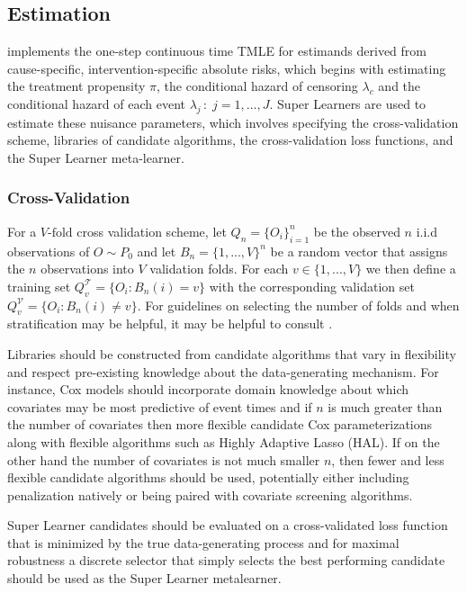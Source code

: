 \documentclass{report}
\newcommand{\1}{\ensuremath{\mathbf{1}}}
\newcommand{\g}{\ensuremath{\pi}}
\begin{document}
\subsection{Estimation}
\label{estimation}
 implements the one-step continuous time TMLE for estimands derived from cause-specific, intervention-specific absolute risks, which begins with estimating the treatment propensity \(\g\), the conditional hazard of censoring \(\lambda_c\) and the conditional hazard of each event \(\lambda_j \,:\; j = 1, \dots, J\). Super Learners are used to estimate these nuisance parameters, which involves specifying the cross-validation scheme, libraries of candidate algorithms, the cross-validation loss functions, and the Super Learner meta-learner.

\subsubsection{Cross-Validation}
\label{cv}
For a \(V\text{-fold}\) cross validation scheme, let \(Q_n = \{O_i\}_{i=1}^n\) be the observed \(n\) i.i.d observations of \(O \sim P_0\) and let \(B_n = \{1, ... , V\}^n\) be a random vector that assigns the \(n\) observations into \(V\) validation folds. For each \(v \in \{1, ..., V\}\) we then define a training set \(Q^\mathcal{T}_v = \{O_i : B_n(i) = v\}\) with the corresponding validation set \(Q^\mathcal{V}_v = \{O_i : B_n(i) \neq v\}\). For guidelines on selecting the number of folds and when stratification may be helpful, it may be helpful to consult \cite{phillips_practical_2022}. 

Libraries should be constructed from candidate algorithms that vary in flexibility and respect pre-existing knowledge about the data-generating mechanism. For instance, Cox models should incorporate domain knowledge about which covariates may be most predictive of event times and if \(n\) is much greater than the number of covariates then more flexible candidate Cox parameterizations along with flexible algorithms such as Highly Adaptive Lasso (HAL). If on the other hand the number of covariates is not much smaller \(n\), then fewer and less flexible candidate algorithms should be used, potentially either including penalization natively or being paired with covariate screening algorithms.

Super Learner candidates should be evaluated on a cross-validated loss function that is minimized by the true data-generating process and for maximal robustness a discrete selector that simply selects the best performing candidate should be used as the Super Learner metalearner.
\end{document}
